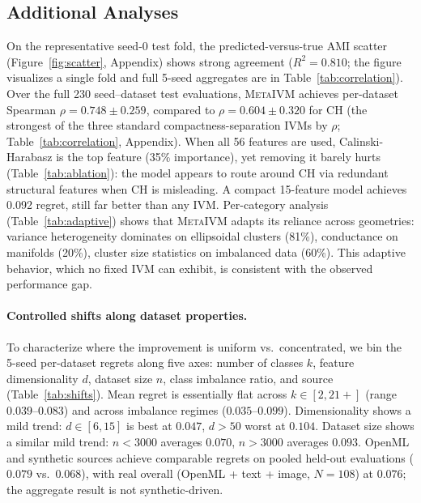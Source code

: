 \documentclass[10pt]{article} %
\newcommand{\ours}{\textsc{MetaIVM}}
\begin{document}
\subsection{Additional Analyses}

On the representative seed-0 test fold, the predicted-versus-true AMI scatter (Figure~\ref{fig:scatter}, Appendix) shows strong agreement ($R^2 = 0.810$; the figure visualizes a single fold and full 5-seed aggregates are in Table~\ref{tab:correlation}). Over the full 230 seed--dataset test evaluations, \ours{} achieves per-dataset Spearman $\rho = 0.748 \pm 0.259$, compared to $\rho = 0.604 \pm 0.320$ for CH (the strongest of the three standard compactness-separation IVMs by $\rho$; Table~\ref{tab:correlation}, Appendix). When all 56 features are used, Calinski-Harabasz is the top feature (35\% importance), yet removing it barely hurts (Table~\ref{tab:ablation}): the model appears to route around CH via redundant structural features when CH is misleading. A compact 15-feature model achieves 0.092 regret, still far better than any IVM. Per-category analysis (Table~\ref{tab:adaptive}) shows that \ours{} adapts its reliance across geometries: variance heterogeneity dominates on ellipsoidal clusters (81\%), conductance on manifolds (20\%), cluster size statistics on imbalanced data (60\%). This adaptive behavior, which no fixed IVM can exhibit, is consistent with the observed performance gap.

\paragraph{Controlled shifts along dataset properties.} To characterize where the improvement is uniform vs.\ concentrated, we bin the 5-seed per-dataset regrets along five axes: number of classes $k$, feature dimensionality $d$, dataset size $n$, class imbalance ratio, and source (Table~\ref{tab:shifts}). Mean regret is essentially flat across $k \in [2, 21+]$ (range $0.039$--$0.083$) and across imbalance regimes ($0.035$--$0.099$). Dimensionality shows a mild trend: $d \in [6, 15]$ is best at $0.047$, $d > 50$ worst at $0.104$. Dataset size shows a similar mild trend: $n < 3000$ averages $0.070$, $n > 3000$ averages $0.093$. OpenML and synthetic sources achieve comparable regrets on pooled held-out evaluations ($0.079$ vs.\ $0.068$), with real overall (OpenML + text + image, $N = 108$) at $0.076$; the aggregate result is not synthetic-driven.
\end{document}
